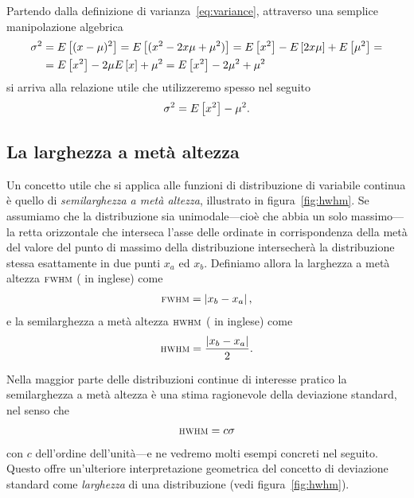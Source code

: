 Partendo dalla definizione di varianza~\eqref{eq:variance}, attraverso una
semplice manipolazione algebrica
\begin{align*}
  \sigma^2 & = \displaystyle E\left[(x - \mu)^2\right] = \displaystyle E\left[(x^2 - 2x\mu + \mu^2)\right] =
  \displaystyle E\left[x^2\right] - \displaystyle E\left[2x\mu\right] + \displaystyle E\left[\mu^2\right] =\\
  & =\displaystyle E\left[x^2\right] - 2\mu \displaystyle E\left[x\right] + \mu^2 =
  \displaystyle E\left[x^2\right] - 2\mu^2 + \mu^2
\end{align*}
si arriva alla relazione utile che utilizzeremo spesso nel seguito
\begin{align}\label{eq:variance_alt}
  \sigma^2 =  \displaystyle E\left[x^2\right] - \mu^2.
\end{align}


\subsection{La larghezza a metà altezza}

Un concetto utile che si applica alle funzioni di distribuzione di variabile
continua è quello di \emph{semilarghezza a metà altezza}, illustrato in
figura~\ref{fig:hwhm}. Se assumiamo che la distribuzione sia unimodale---cioè
che abbia un solo massimo---la retta orizzontale che interseca l'asse delle
ordinate in corrispondenza della metà del valore del punto di massimo della
distribuzione intersecherà la distribuzione stessa esattamente in due punti
$x_a$ ed $x_b$. Definiamo allora la larghezza a metà altezza ${\scriptstyle \textsc{FWHM}}$
( in inglese) come
\begin{align}
  {\scriptstyle \textsc{FWHM}} = \left| x_b - x_a \right|,
\end{align}
e la semilarghezza a metà altezza ${\scriptstyle \textsc{HWHM}}$ (
in inglese) come
\begin{align}
  {\scriptstyle \textsc{HWHM}} = \frac{\left| x_b - x_a \right|}{2}.
\end{align}


Nella maggior parte delle distribuzioni continue di interesse pratico la
semilarghezza a metà altezza è una stima ragionevole della deviazione
standard, nel senso che
\begin{align}
  {\scriptstyle \textsc{HWHM}} = c\sigma
\end{align}
con $c$ dell'ordine dell'unità---e ne vedremo molti esempi concreti nel
seguito. Questo offre un'ulteriore interpretazione geometrica del concetto di
deviazione standard come \emph{larghezza} di una distribuzione
(vedi figura~\ref{fig:hwhm}).


